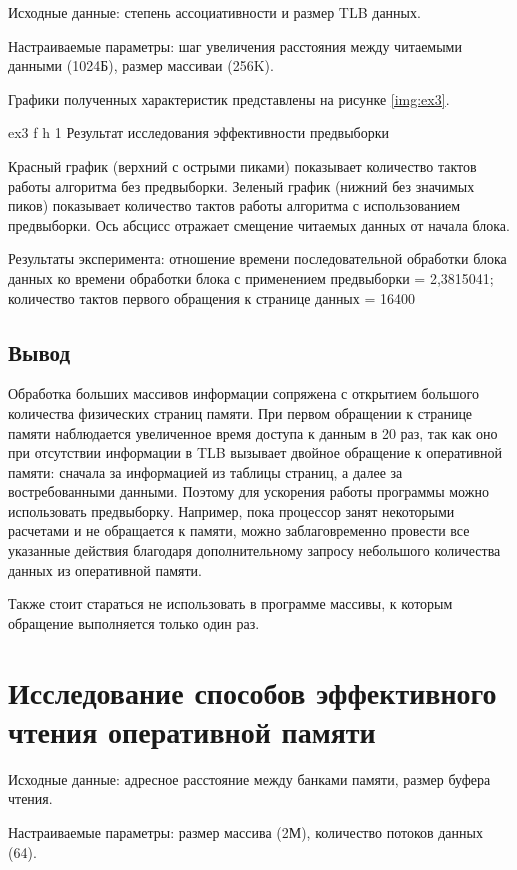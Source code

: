 Исходные данные: степень ассоциативности и размер TLB данных.

Настраиваемые параметры: шаг увеличения расстояния между читаемыми данными (1024Б), размер массиваи (256K).

Графики полученных характеристик представлены на рисунке \ref{img:ex3}.

{ex3}
{f}
{h}
{1\textwidth}
{Результат  исследования эффективности предвыборки}

Красный график (верхний с острыми пиками) показывает количество тактов работы алгоритма без предвыборки.
Зеленый график (нижний без значимых пиков) показывает количество тактов работы алгоритма с использованием предвыборки.
Ось абсцисс отражает смещение читаемых данных от начала блока.

Результаты эксперимента: отношение времени последовательной обработки блока
данных ко времени обработки блока с применением предвыборки =  2,3815041;
количество тактов первого обращения к странице данных = 16400

\section*{Вывод}
Обработка больших массивов информации сопряжена с открытием большого количества физических страниц памяти.
При первом обращении к странице памяти наблюдается увеличенное время доступа к данным в 20 раз,
так как оно при отсутствии информации в TLB вызывает двойное обращение к оперативной памяти:
сначала за информацией из таблицы страниц, а далее за востребованными данными.
Поэтому для ускорения работы программы можно использовать предвыборку.
Например, пока процессор занят некоторыми расчетами и не обращается к памяти,
можно заблаговременно провести все указанные действия благодаря дополнительному запросу небольшого количества данных из оперативной памяти.

Также стоит стараться не использовать в программе массивы, к которым обращение выполняется только один раз.

\chapter{Исследование способов эффективного чтения оперативной памяти}

Исходные данные: адресное расстояние между банками памяти, размер буфера чтения.

Настраиваемые параметры: размер массива (2М), количество потоков данных (64).

